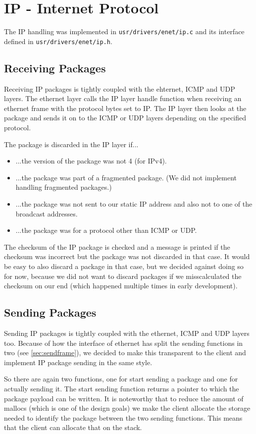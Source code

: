 \section{IP - Internet Protocol}
The IP handling was implemented in \verb|usr/drivers/enet/ip.c| and its interface defined in \verb|usr/drivers/enet/ip.h|.

\subsection{Receiving Packages}
Receiving IP packages is tightly coupled with the ehternet, ICMP and UDP layers. The ethernet layer calls the IP layer handle function when receiving an ethernet frame with the protocol bytes set to IP. The IP layer then looks at the package and sends it on to the ICMP or UDP layers depending on the specified protocol.

The package is discarded in the IP layer if...
\begin{itemize}
    \item ...the version of the package was not 4 (for IPv4).
    \item ...the package was part of a fragmented package. (We did not implement handling fragmented packages.)
    \item ...the package was not sent to our static IP address and also not to one of the broadcast addresses.
    \item ...the package was for a protocol other than ICMP or UDP.
\end{itemize}

The checksum of the IP package is checked and a message is printed if the checksum was incorrect but the package was not discarded in that case. It would be easy to also discard a package in that case, but we decided against doing so for now, because we did not want to discard packages if we misscalculated the checksum on our end (which happened multiple times in early development).

\subsection{Sending Packages}
Sending IP packages is tightly coupled with the ethernet, ICMP and UDP layers too. Because of how the interface of ethernet has split the sending functions in two (see \ref{sec:sendframe}), we decided to make this transparent to the client and implement IP package sending in the same style.

So there are again two functions, one for start sending a package and one for actually sending it. The start sending function returns a pointer to which the package payload can be written. It is noteworthy that to reduce the amount of mallocs (which is one of the design goals) we make the client allocate the storage needed to identify the package between the two sending functions. This means that the client can allocate that on the stack.


